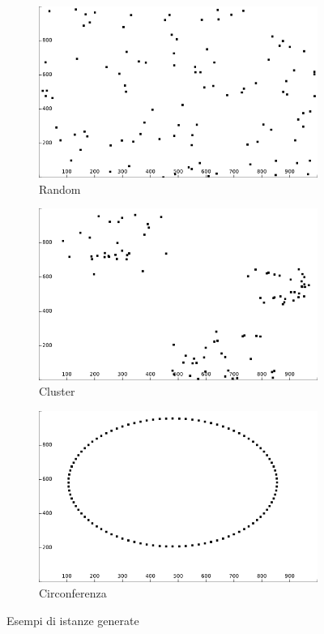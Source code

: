 \begin{figure}
\centering
\begin{subfigure}[h]{0.45\textwidth}
\includegraphics[width=\textwidth]{Images/Part_1/Instances/Random.png}
\caption{Random}
\label{pt1:generator:random_img}
\end{subfigure}
\quad{}
\begin{subfigure}[h]{0.45\textwidth}
\includegraphics[width=\textwidth]{Images/Part_1/Instances/Cluster.png}
\caption{Cluster}
\label{pt1:generator:cluster_img}
\end{subfigure}

\begin{subfigure}[h]{0.5\textwidth}
\includegraphics[width=\textwidth]{Images/Part_1/Instances/Circle.png}
\caption{Circonferenza}
\label{pt1:generator:Circle_img}
\end{subfigure}
\caption{Esempi di istanze generate}
\label{pt1:generator:imgs}
\end{figure}